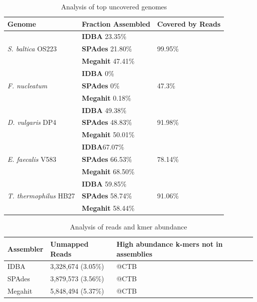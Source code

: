 \documentclass[10pt,a4paper,twocolumn]{article}
\begin{document}
\begin{table}[!h]
\centering
\caption{Analysis of top uncovered genomes}
\begin{tabular}{|p{4cm}|p{2.5cm}|p{1.11cm}|}\hline
\textbf{Genome} & \textbf{Fraction Assembled} & \textbf {Covered by Reads} \\ \hline 
\multirow{3}{*}{{\em S. baltica} OS223 }&\textbf{IDBA} 23.35\%   &\multirow{3}{*}{99.95\%}\\  
&\textbf{SPAdes } 21.80\% & \\  
&\textbf{Megahit} 47.41\% & \\ \hline
\multirow{3}{*}{{\em F. nucleatum}}  &\textbf{IDBA} 0\%&\multirow{3}{*}{47.3\%} \\ 
&\textbf{SPAdes} 0\%& \\
&\textbf{Megahit} 0.18\%& \\ \hline
\multirow{3}{*}{{\em D. vulgaris} DP4}  &\textbf{IDBA} 49.38\%  &\multirow{3}{*}{91.98\%}\\  
&\textbf{SPAdes} 48.83\% & \\ 
&\textbf{Megahit} 50.01\% & \\ \hline 
\multirow{3}{*}{{\em E. faecalis} V583}  &\textbf{IDBA}67.07\%&\multirow{3}{*}{78.14\%} \\  
&\textbf{SPAdes} 66.53\% & \\
&\textbf{Megahit} 68.50\% & \\ \hline
\multirow{3}{*}{{\em T. thermophilus} HB27}  &\textbf{IDBA} 59.85\% &\multirow{3}{*}{91.06\%}\\  
&\textbf{SPAdes} 58.74\% & \\ 
&\textbf{Megahit} 58.44\%& \\ \hline
\end{tabular}
\label{table:genomes_uncovered-analysis}
\end{table}





\begin{table}[!h]
\centering
\caption{Analysis of reads and kmer abundance}
\begin{tabular}{|p{1.5cm}|p{1.5cm}|p{2.5cm}|}\hline
\textbf{Assembler} & \textbf{Unmapped Reads} & \textbf {High abundance k-mers not in assemblies} \\ \hline 
IDBA &3,328,674 (3.05\%)&  @CTB \\ \hline
SPAdes &3,879,573 (3.56\%) &  @CTB \\ \hline
Megahit &5,848,494 (5.37\%) &   @CTB \\ \hline
\end{tabular}
\label{table:reads-kmers}
\end{table}
\end{document}
